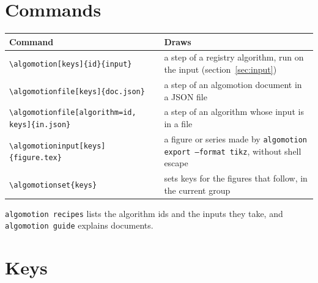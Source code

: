 \documentclass[11pt]{article}
\newcommand\cs[1]{\texttt{\textbackslash#1}}
\begin{document}
\section{Commands}

\begin{center}
  \begin{tabularx}{\linewidth}{@{}lX@{}}
    \toprule
    Command & Draws \\
    \midrule
    \cs{algomotion}\texttt{[keys]\{id\}\{input\}} & a step of a registry
      algorithm, run on the input (section~\ref{sec:input}) \\
    \cs{algomotionfile}\texttt{[keys]\{doc.json\}} & a step of an algomotion
      document in a JSON file \\
    \cs{algomotionfile}\texttt{[algorithm=id, keys]\{in.json\}} & a step of
      an algorithm whose input is in a file \\
    \cs{algomotioninput}\texttt{[keys]\{figure.tex\}} & a figure or series
      made by \texttt{algomotion export --format tikz}, without shell escape \\
    \cs{algomotionset}\texttt{\{keys\}} & sets keys for the figures that
      follow, in the current group \\
    \bottomrule
  \end{tabularx}
\end{center}

\noindent \texttt{algomotion recipes} lists the algorithm ids and the inputs
they take, and \texttt{algomotion guide} explains documents.

\section{Keys}
\end{document}
